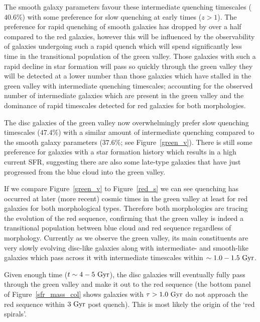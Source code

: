 The smooth galaxy parameters favour these intermediate quenching timescales ($40.6\%$) with some preference for slow quenching at  early times ($z > 1$). The preference for rapid quenching of smooth galaxies has dropped by over a half compared to the red galaxies, however this will be influenced by the observability of galaxies undergoing such a rapid quench which will spend significantly less time in the transitional population of the green valley. Those galaxies with such a rapid decline in star formation will pass so quickly through the green valley they will be detected at a lower number than those galaxies which have stalled in the green valley with intermediate quenching timescales; accounting for the observed number of intermediate galaxies which are present in the green valley and the dominance of rapid timescales detected for red galaxies for both morphologies.

The disc galaxies of the green valley now overwhelmingly prefer slow quenching timescales ($47.4\%$) with a similar amount of intermediate quenching compared to the smooth galaxy parameters ($37.6\%$; see Figure~\ref{green_v}). There is still some preference for galaxies with a star formation history which results in a high current SFR, suggesting there are also some late-type galaxies that have just progressed from the blue cloud into the green valley. 

If we compare Figure~\ref{green_v} to Figure~\ref{red_s}  we can see quenching has occurred at later (more recent) cosmic times in the green valley at least for red galaxies for both morphological types. Therefore both morphologies are tracing the evolution of the red sequence, confirming that the green valley is indeed a transitional population between blue cloud and red sequence regardless of morphology. Currently as we observe the green valley, its main constituents are very slowly evolving disc-like galaxies along with intermediate- and smooth-like galaxies which pass across it with intermediate timescales within $\sim 1.0-1.5~\rm{Gyr}$.

Given enough time ($t\sim4 - 5~\rm{Gyr}$), the disc galaxies will eventually fully pass through the green valley and make it out to the red sequence (the bottom panel of Figure~\ref{sfr_mass_col} shows galaxies with $\tau > 1.0~\rm{Gyr}$ do not approach the red sequence within $3~\rm{Gyr}$ post quench). This is most likely the origin of the `red spirals'.

